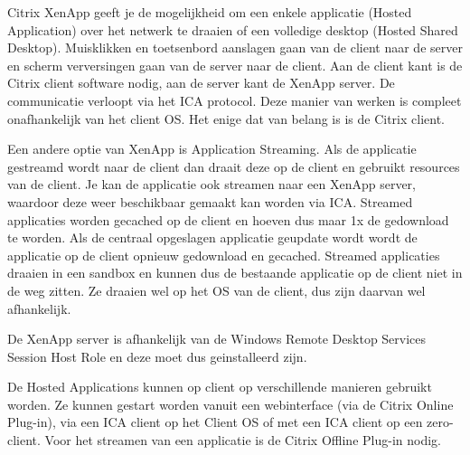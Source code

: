 Citrix XenApp geeft je de mogelijkheid om een enkele applicatie (Hosted Application) over het netwerk te draaien of een volledige desktop (Hosted Shared Desktop). Muisklikken en toetsenbord aanslagen gaan van de client naar de server en scherm verversingen gaan van de server naar de client. Aan de client kant is de Citrix client software nodig, aan de server kant de XenApp server. De communicatie verloopt via het ICA protocol. Deze manier van werken is compleet onafhankelijk van het client OS. Het enige dat van belang is is de Citrix client.

Een andere optie van XenApp is Application Streaming. Als de applicatie gestreamd wordt naar de client dan draait deze op de client en gebruikt resources van de client. Je kan de applicatie ook streamen naar een XenApp server, waardoor deze weer beschikbaar gemaakt kan worden via ICA. Streamed applicaties worden gecached op de client en hoeven dus maar 1x de gedownload te worden. Als de centraal opgeslagen applicatie geupdate wordt wordt de applicatie op de client opnieuw gedownload en gecached. Streamed applicaties draaien in een sandbox en kunnen dus de bestaande applicatie op de client niet in de weg zitten. Ze draaien wel op het OS van de client, dus zijn daarvan wel afhankelijk.

De XenApp server is afhankelijk van de Windows Remote Desktop Services Session Host Role en deze moet dus geinstalleerd zijn.

De Hosted Applications kunnen op client op verschillende manieren gebruikt worden. Ze kunnen gestart worden vanuit een webinterface (via de Citrix Online Plug-in), via een ICA client op het Client OS of met een ICA client op een zero-client. Voor het streamen van een applicatie is de Citrix Offline Plug-in nodig.
